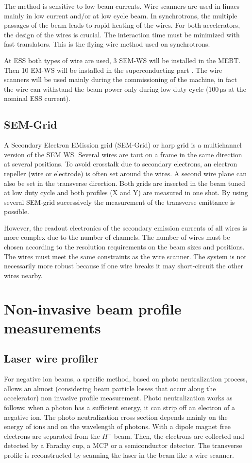 \begin{refsection}
  The method is sensitive to low beam currents. Wire scanners are used in linacs mainly in low current and/or at low cycle beam. In synchrotrons, the multiple passages of the beam leads to rapid heating of the wires.
  For both accelerators, the design of the wires is crucial. The interaction time must be minimized with fast translators. This is the flying wire method used on synchrotrons.

  At ESS both types of wire are used, 3 SEM-WS will be installed in the MEBT. Then 10 EM-WS will be installed in the superconducting part \cite{Cheymol:HB2016-MOPL018}. The wire scanners will be used mainly during the commissioning of the machine, in fact the wire can withstand the beam power only during low duty cycle ($100\,\mathrm{\mu s}$ at the nominal ESS current).

  \subsection{SEM-Grid}
  A Secondary Electron EMission grid (SEM-Grid) or harp grid is a multichannel version of the SEM WS. Several wires are taut on a frame in the same direction at several positions. To avoid crosstalk due to secondary electrons, an electron repeller (wire or electrode) is often set around the wires. A second wire plane can also be set in the transverse direction. Both grids are inserted in the beam tuned at low duty cycle and both profiles (X and Y) are measured in one shot. By using several SEM-grid successively the measurement of the transverse emittance is possible.

  However, the readout electronics of the secondary emission currents of all wires is more complex due to the number of channels. The number of wires must be chosen according to the resolution requirements on the beam sizes and positions. The wires must meet the same constraints as the wire scanner. The system is not necessarily more robust because if one wire breaks it may short-circuit the other wires nearby.

  \section{Non-invasive beam profile measurements}
  \subsection{Laser wire profiler}
  For negative ion beams, a specific method, based on photo neutralization process, allows an almost (considering beam particle losses that occur along the accelerator) non invasive profile measurement. Photo neutralization works as follows: when a photon has a sufficient energy, it can strip off an electron of a negative ion.
  The photo neutralization cross section depends mainly on the energy of ions and on the wavelength of photons. With a dipole magnet free electrons are separated from the $H^-$ beam. Then, the electrons are collected and detected by a Faraday cup, a MCP or a semiconductor detector. The transverse profile is reconstructed by scanning the laser in the beam like a wire scanner.


\end{refsection}
